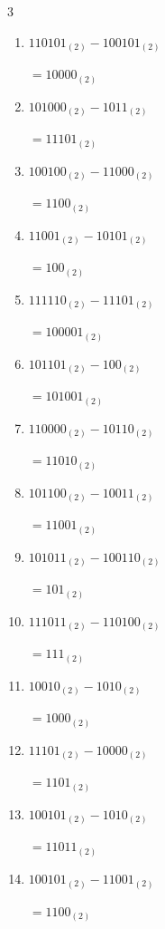 \begin{multicols}{3}
\begin{enumerate}
  \item $110101_{(2)} - 100101_{(2)}$

        $=10000_{(2)}$

  \item $101000_{(2)} - 1011_{(2)}$

        $=11101_{(2)}$

  \item $100100_{(2)} - 11000_{(2)}$

        $=1100_{(2)}$

  \item $11001_{(2)} - 10101_{(2)}$

        $=100_{(2)}$

  \item $111110_{(2)} - 11101_{(2)}$

        $=100001_{(2)}$

  \item $101101_{(2)} - 100_{(2)}$

        $=101001_{(2)}$

\columnbreak %

\resetques

  \item $110000_{(2)} - 10110_{(2)}$

        $=11010_{(2)}$

  \item $101100_{(2)} - 10011_{(2)}$

        $=11001_{(2)}$

  \item $101011_{(2)} - 100110_{(2)}$

        $=101_{(2)}$

  \item $111011_{(2)} - 110100_{(2)}$

        $=111_{(2)}$

  \item $10010_{(2)} - 1010_{(2)}$

        $=1000_{(2)}$

  \item $11101_{(2)} - 10000_{(2)}$

        $=1101_{(2)}$

  \item $100101_{(2)} - 1010_{(2)}$

        $=11011_{(2)}$

  \item $100101_{(2)} - 11001_{(2)}$

        $=1100_{(2)}$


\end{enumerate}
\end{multicols}
